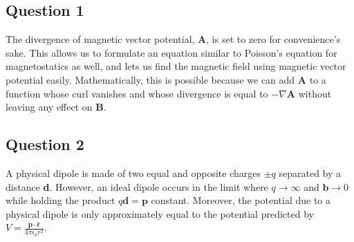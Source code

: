 \documentclass{article}
\begin{document}
\subsection*{Question 1}
The divergence of magnetic vector potential, \textbf{A}, is set to zero for convenience's sake. This allows us to formulate an equation similar to Poisson's equation for magnetostatics as well, and lets us find the magnetic field using magnetic vector potential easily. Mathematically, this is possible because we can add \textbf{A} to a function whose curl vanishes and whose divergence is equal to $-\nabla$\textbf{A} without leaving any effect on \textbf{B}.

\bigskip
\subsection*{Question 2}
A physical dipole is made of two equal and opposite charges $\pm q$ separated by a distance \textbf{d}. However, an ideal dipole occurs in the limit where $q\longrightarrow\infty$ and $\textbf{b}\longrightarrow0$ while holding the product $q\textbf{d} = \textbf{p}$ constant. Moreover, the potential due to a physical dipole is only approximately equal to the potential predicted by $V = \frac{\textbf{p}\cdot \hat{\textbf{r}}}{4\pi\epsilon_0 r^2}$.

\bigskip
\end{document}

